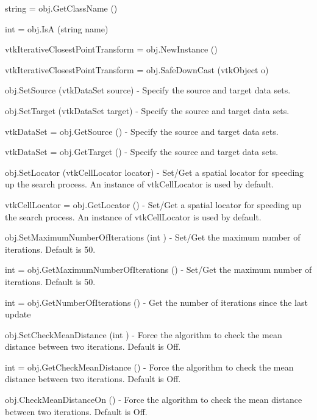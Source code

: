 \begin{DoxyItemize}
\item {\ttfamily string = obj.\-Get\-Class\-Name ()}  
\item {\ttfamily int = obj.\-Is\-A (string name)}  
\item {\ttfamily vtk\-Iterative\-Closest\-Point\-Transform = obj.\-New\-Instance ()}  
\item {\ttfamily vtk\-Iterative\-Closest\-Point\-Transform = obj.\-Safe\-Down\-Cast (vtk\-Object o)}  
\item {\ttfamily obj.\-Set\-Source (vtk\-Data\-Set source)} -\/ Specify the source and target data sets.  
\item {\ttfamily obj.\-Set\-Target (vtk\-Data\-Set target)} -\/ Specify the source and target data sets.  
\item {\ttfamily vtk\-Data\-Set = obj.\-Get\-Source ()} -\/ Specify the source and target data sets.  
\item {\ttfamily vtk\-Data\-Set = obj.\-Get\-Target ()} -\/ Specify the source and target data sets.  
\item {\ttfamily obj.\-Set\-Locator (vtk\-Cell\-Locator locator)} -\/ Set/\-Get a spatial locator for speeding up the search process. An instance of vtk\-Cell\-Locator is used by default.  
\item {\ttfamily vtk\-Cell\-Locator = obj.\-Get\-Locator ()} -\/ Set/\-Get a spatial locator for speeding up the search process. An instance of vtk\-Cell\-Locator is used by default.  
\item {\ttfamily obj.\-Set\-Maximum\-Number\-Of\-Iterations (int )} -\/ Set/\-Get the maximum number of iterations. Default is 50.  
\item {\ttfamily int = obj.\-Get\-Maximum\-Number\-Of\-Iterations ()} -\/ Set/\-Get the maximum number of iterations. Default is 50.  
\item {\ttfamily int = obj.\-Get\-Number\-Of\-Iterations ()} -\/ Get the number of iterations since the last update  
\item {\ttfamily obj.\-Set\-Check\-Mean\-Distance (int )} -\/ Force the algorithm to check the mean distance between two iterations. Default is Off.  
\item {\ttfamily int = obj.\-Get\-Check\-Mean\-Distance ()} -\/ Force the algorithm to check the mean distance between two iterations. Default is Off.  
\item {\ttfamily obj.\-Check\-Mean\-Distance\-On ()} -\/ Force the algorithm to check the mean distance between two iterations. Default is Off.  

\end{DoxyItemize}
